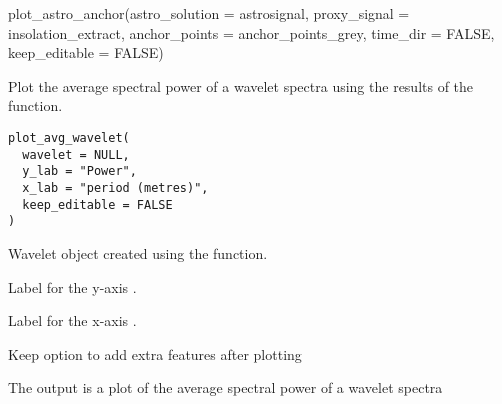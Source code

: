 \documentclass[a4paper]{book}
\begin{document}
\begin{Examples}
\begin{ExampleCode}
plot_astro_anchor(astro_solution = astrosignal,
proxy_signal = insolation_extract,
anchor_points = anchor_points_grey,
time_dir = FALSE,
keep_editable = FALSE)



\end{ExampleCode}
\end{Examples}
%
\begin{Description}
Plot the average spectral power of a wavelet spectra using the results of
the  function.
\end{Description}
%
\begin{Usage}
\begin{verbatim}
plot_avg_wavelet(
  wavelet = NULL,
  y_lab = "Power",
  x_lab = "period (metres)",
  keep_editable = FALSE
)
\end{verbatim}
\end{Usage}
%
\begin{Arguments}
\begin{ldescription}
\item[\code{wavelet}] Wavelet object created using the  function.

\item[\code{y\_lab}] Label for the y-axis .

\item[\code{x\_lab}] Label for the x-axis .

\item[\code{keep\_editable}] Keep option to add extra features after plotting  
\end{ldescription}
\end{Arguments}
%
\begin{Value}
The output is a plot of the average spectral power of a wavelet spectra
\end{Value}
%
\end{document}
